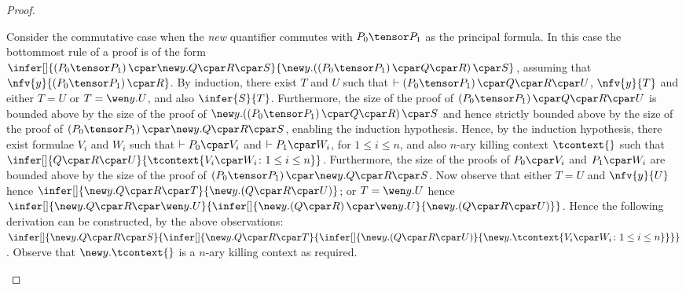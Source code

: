 \documentclass[UKenglish,acmsmall,authorversion]{acmart}
\theoremstyle{plain}
\begin{document}
{\begin{proof}
\begin{enumerate}[label=\textbf{\Alph*},ref=\Alph*,leftmargin=*]
{Consider the commutative case when the \textit{new} quantifier commutes with $P_0 \tensor P_1$ as the principal formula.
In this case the bottommost rule of a proof is of the form $
\infer[]{
\left( P_0 \tensor P_1 \right) \cpar \new y. Q \cpar R \cpar S
}{
\mathopen{\new y.} \left( \left( P_0 \tensor P_1 \right) \cpar Q \cpar R\right) \cpar S
}$,
assuming that $\nfv{y}{\left( P_0 \tensor P_1 \right) \cpar R}$.
By induction, there exist $T$ and $U$ such that $\vdash \left( P_0 \tensor P_1 \right) \cpar Q \cpar R \cpar U$, $\nfv{y}{T}$ and either $T = U$ or $T = \wen y. U$, and also
$\infer{S}{T}$.
%
Furthermore, the size of the proof of $\left( P_0 \tensor P_1 \right) \cpar Q \cpar R \cpar U$ is bounded above by the size of the proof of $\mathopen{\new y.} \left( \left( P_0 \tensor P_1 \right) \cpar Q \cpar R\right) \cpar S$ and hence strictly bounded above by the size of the proof of $\left( P_0 \tensor P_1 \right) \cpar \new y. Q \cpar R \cpar S$, enabling the induction hypothesis.
Hence, by the induction hypothesis, there exist formulae $V_i$ and $W_i$ such that $\vdash P_0 \cpar V_i$ and $\vdash P_1 \cpar W_i$, for $1 \leq i \leq n$, and also $n$-ary killing context $\tcontext{}$ such that
$
\infer[]{
Q \cpar R \cpar U 
}{
\tcontext{ V_i \cpar W_i \colon 1 \leq i \leq n }
}$.
Furthermore, the size of the proofs of $P_0 \cpar V_i$ and $P_1 \cpar W_i$ are bounded above by the size of the proof of $\left( P_0 \tensor P_1 \right) \cpar \new y. Q \cpar R \cpar S$.
%
Now observe that either $T = U$ and $\nfv{y}{U}$ hence
$\infer[]{
\new y. Q \cpar R \cpar T
}{
 \mathopen{\new y.} \left(Q \cpar R \cpar U\right)
}$;
or $T = \wen y. U$ hence $
\infer[]{
\new y. Q \cpar R \cpar \wen y. U
}{
\infer[]{
 \mathopen{\new y.} \left(Q \cpar R\right) \cpar \wen y. U
}{
 \mathopen{\new y.} \left(Q \cpar R \cpar U\right)
}}$.
Hence the following derivation can be constructed, by the above observations:
$
\infer[]{
\new y. Q \cpar R \cpar S
}{
\infer[]{
\new y. Q \cpar R \cpar T
}{
\infer[]{
\mathopen{\new y.} \left( Q \cpar R \cpar U \right)
}{
\new y. \tcontext{ V_i \cpar W_i \colon 1 \leq i \leq n }
}}}
$.
Observe that $\new y. \tcontext{ }$ is a $n$-ary killing context as required.
\smallskip


}
\end{enumerate}
\end{proof}}
\end{document}

